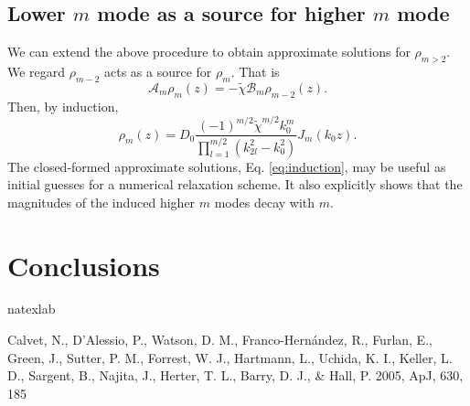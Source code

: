 \documentclass[apj]{emulateapj}
\newcommand{\beq}{\begin{equation}}
\newcommand{\eeq}{\end{equation}}
\begin{document}
\subsection{Lower $m$ mode as a source for higher $m$ mode}
We can extend the above procedure to obtain approximate solutions for
$\rho_{m>2}$. We regard $\rho_{m-2}$ acts as a source for $\rho_{m}$. That is
\beq\label{eq:higherm}
\mathcal{A}_m\rho_m(z) = -\tilde{\chi}\mathcal{B}_m\rho_{m-2}(z). 
\eeq 
Then, by induction,
\beq\label{eq:induction}
\rho_m(z) =D_0
\frac{(-1)^{m/2}\tilde{\chi}^{m/2}k_0^m}{\prod_{l=1}^{m/2}(k_{2l}^2-k_0^2)}J_m(k_0z). 
\eeq
The closed-formed approximate solutions, Eq. \ref{eq:induction}, may be useful as initial
guesses for a numerical relaxation scheme. It also explicitly shows that the
magnitudes of the induced higher $m$ modes decay with $m$.  



\section{Conclusions}

\acknowledgments

\begin{thebibliography}{}
\expandafter\ifx\csname natexlab\endcsname\relax\def\natexlab#1{#1}\fi

 Calvet, N., D'Alessio, P.,
  Watson, D. M., Franco-Hernández, R., Furlan, E., Green, J., Sutter,
  P. M., Forrest, W. J., Hartmann, L., Uchida, K. I., Keller, L. D.,
  Sargent, B., Najita, J., Herter, T. L., Barry, D. J., \& Hall,
  P. 2005, ApJ, 630, 185



\end{thebibliography}
\end{document}
